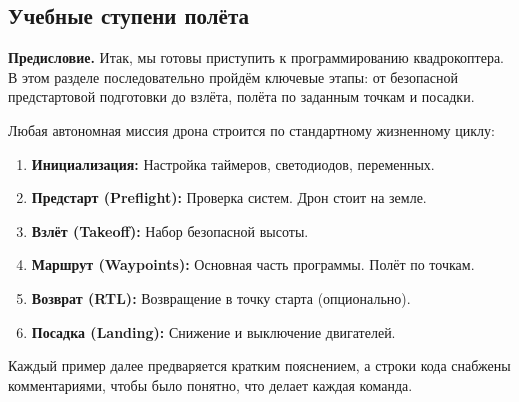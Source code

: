 \subsection{Учебные ступени полёта}

\textbf{Предисловие.} Итак, мы готовы приступить к программированию квадрокоптера. В этом разделе последовательно пройдём ключевые этапы: от безопасной предстартовой подготовки до взлёта, полёта по заданным точкам и посадки.

Любая автономная миссия дрона строится по стандартному жизненному циклу:

\begin{infobox}
\begin{enumerate}
    \item \textbf{Инициализация:} Настройка таймеров, светодиодов, переменных.
    \item \textbf{Предстарт (Preflight):} Проверка систем. Дрон стоит на земле.
    \item \textbf{Взлёт (Takeoff):} Набор безопасной высоты.
    \item \textbf{Маршрут (Waypoints):} Основная часть программы. Полёт по точкам.
    \item \textbf{Возврат (RTL):} Возвращение в точку старта (опционально).
    \item \textbf{Посадка (Landing):} Снижение и выключение двигателей.
\end{enumerate}
\end{infobox}

Каждый пример далее предваряется кратким пояснением, а строки кода снабжены комментариями, чтобы было понятно, что делает каждая команда.
